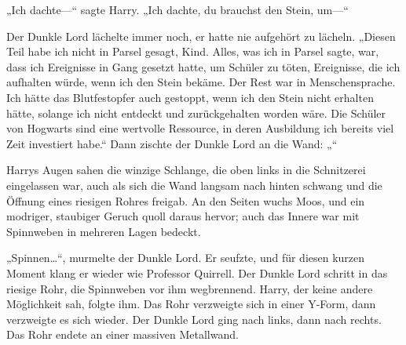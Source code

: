 „Ich dachte—“ sagte Harry. „Ich dachte, du brauchst den Stein, um—“

Der Dunkle Lord lächelte immer noch, er hatte nie aufgehört zu lächeln.
„Diesen Teil habe ich nicht in Parsel gesagt, Kind. Alles, was ich in Parsel sagte, war, dass ich Ereignisse in Gang gesetzt hatte, um Schüler zu töten, Ereignisse, die ich aufhalten würde, wenn ich den Stein bekäme. Der Rest war in Menschensprache. Ich hätte das Blutfestopfer auch gestoppt, wenn ich den Stein nicht erhalten hätte, solange ich nicht entdeckt und zurückgehalten worden wäre. Die Schüler von Hogwarts sind eine wertvolle Ressource, in deren Ausbildung ich bereits viel Zeit investiert habe.“
Dann zischte der Dunkle Lord an die Wand:
„“

Harrys Augen sahen die winzige Schlange, die oben links in die Schnitzerei eingelassen war, auch als sich die Wand langsam nach hinten schwang und die Öffnung eines riesigen Rohres freigab. An den Seiten wuchs Moos, und ein modriger, staubiger Geruch quoll daraus hervor; auch das Innere war mit Spinnweben in mehreren Lagen bedeckt.

„Spinnen…“, murmelte der Dunkle Lord.
Er seufzte, und für diesen kurzen Moment klang er wieder wie Professor Quirrell.
Der Dunkle Lord schritt in das riesige Rohr, die Spinnweben vor ihm wegbrennend. Harry, der keine andere Möglichkeit sah, folgte ihm.
Das Rohr verzweigte sich in einer Y-Form, dann verzweigte es sich wieder. Der Dunkle Lord ging nach links, dann nach rechts. Das Rohr endete an einer massiven Metallwand.

